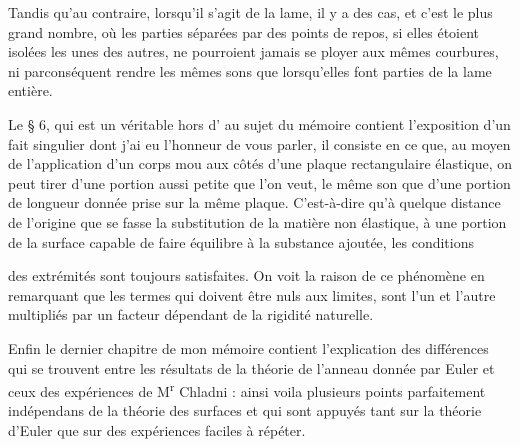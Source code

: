\documentclass[11pt,a4paper]{article}
\begin{document}
Tandis qu'au contraire, lorsqu'il s'agit de la lame, il y a des cas, et c'est le plus grand nombre, où les parties \struck{\ill{}} séparées par des points de repos, si elles étoient isolées les unes des autres, ne pourroient jamais se ployer aux mêmes courbures, ni parconséquent rendre les mêmes sons que lorsqu'elles font parties de la lame entière.

Le § 6, qui est un véritable hors d' au sujet du mémoire contient l'exposition d'un fait singulier dont j'ai eu l'honneur de vous parler, il consiste en ce que, au moyen de l'application d'un corps mou aux côtés d'une plaque rectangulaire élastique, on peut tirer d'une portion aussi petite que l'on veut, le même son que d'une portion de longueur donnée prise sur la même plaque. C'est-à-dire qu'à quelque distance de l'origine que se fasse la substitution de la matière non élastique, à une portion de la surface capable de faire équilibre à la substance ajoutée, les conditions


des extrémités sont toujours satisfaites. On voit la raison de ce phénomène en remarquant que les termes qui doivent être nuls aux limites, sont l'un et l'autre multipliés par un facteur dépendant de la rigidité naturelle.

Enfin le dernier chapitre de mon mémoire contient  l'explication des différences qui se trouvent entre les résultats de la théorie de l'anneau donnée par Euler et ceux des expériences de M\textsuperscript{r} Chladni : ainsi voila  plusieurs points parfaitement indépendans de la théorie des surfaces et qui sont appuyés tant sur la théorie d'Euler que sur des expériences faciles à répéter.
\end{document}
